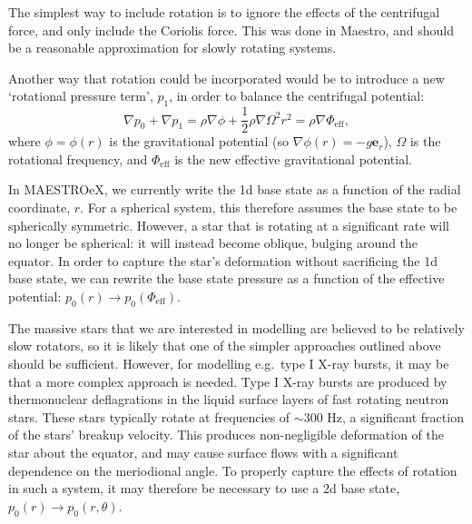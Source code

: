 \documentclass[a4paper]{jpconf}
\newcommand{\maestro}{{\sffamily Maestro}}
\newcommand{\maestroex}{{\sffamily MAESTROeX}}
\begin{document}
The simplest way to include rotation is to ignore the effects of the centrifugal force, and only include the Coriolis force. This was done in \maestro, and should be a reasonable approximation for slowly rotating systems. 

Another way that rotation could be incorporated would be to introduce a new `rotational pressure term', $p_1$, in order to balance the centrifugal potential:
\begin{equation}
    \nabla p_0 + \nabla p_1 = \rho \nabla \phi + \frac{1}{2}\rho \nabla\Omega^2 r^2 = \rho \nabla \Phi_{\text{eff}},
\end{equation}
where $\phi = \phi(r)$ is the gravitational potential (so $\nabla \phi(r) = -g \bm{e}_r$), $\Omega$ is the rotational frequency, and $\Phi_{\text{eff}}$ is the new effective gravitational potential. 

In \maestroex, we currently write the 1d base state as a function of the radial coordinate, $r$. For a spherical system, this therefore assumes the base state to be spherically symmetric. However, a star that is rotating at a significant rate will no longer be spherical: it will instead become oblique, bulging around the equator. In order to capture the star's deformation without sacrificing the 1d base state, we can rewrite the base state pressure as a function of the effective potential: $p_0(r)\rightarrow p_0(\Phi_{\text{eff}})$. 

The massive stars that we are interested in modelling are believed to be relatively slow rotators, so it is likely that one of the simpler approaches outlined above should be sufficient. However, for modelling e.g.~type I X-ray bursts, it may be that a more complex approach is needed. Type I X-ray bursts are produced by thermonuclear deflagrations in the liquid surface layers of fast rotating neutron stars. These stars typically rotate at frequencies of $\sim$300 Hz, a significant fraction of the stars' breakup velocity. This produces non-negligible deformation of the star about the equator, and may cause surface flows with a significant dependence on the meriodional angle. To properly capture the effects of rotation in such a system, it may therefore be necessary to use a 2d base state, $p_0(r)\rightarrow p_0(r, \theta)$. 

\end{document}
